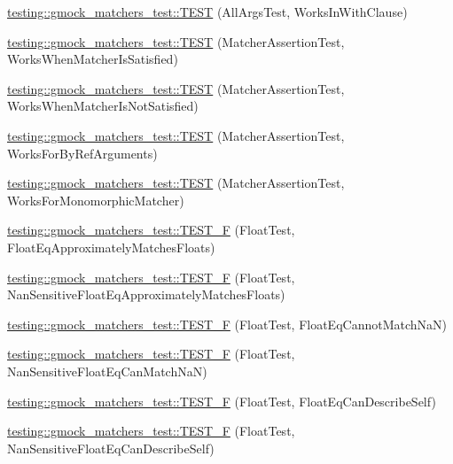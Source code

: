 \begin{DoxyCompactItemize}
\item 
\hyperlink{namespacetesting_1_1gmock__matchers__test_ad62534535946b2ef45457fb653f73a98}{testing\+::gmock\+\_\+matchers\+\_\+test\+::\+T\+E\+ST} (All\+Args\+Test, Works\+In\+With\+Clause)
\item 
\hyperlink{namespacetesting_1_1gmock__matchers__test_ad37559f9112c04334a62ce9617cf1349}{testing\+::gmock\+\_\+matchers\+\_\+test\+::\+T\+E\+ST} (Matcher\+Assertion\+Test, Works\+When\+Matcher\+Is\+Satisfied)
\item 
\hyperlink{namespacetesting_1_1gmock__matchers__test_a2f3755be7052d6e7769e3323053399d0}{testing\+::gmock\+\_\+matchers\+\_\+test\+::\+T\+E\+ST} (Matcher\+Assertion\+Test, Works\+When\+Matcher\+Is\+Not\+Satisfied)
\item 
\hyperlink{namespacetesting_1_1gmock__matchers__test_afcf1287c7fd759157367026613ddd727}{testing\+::gmock\+\_\+matchers\+\_\+test\+::\+T\+E\+ST} (Matcher\+Assertion\+Test, Works\+For\+By\+Ref\+Arguments)
\item 
\hyperlink{namespacetesting_1_1gmock__matchers__test_a0fe4bde05f667c4877e3b4a4a7bde002}{testing\+::gmock\+\_\+matchers\+\_\+test\+::\+T\+E\+ST} (Matcher\+Assertion\+Test, Works\+For\+Monomorphic\+Matcher)
\item 
\hyperlink{namespacetesting_1_1gmock__matchers__test_a69257e935b4334c835b3ad26acea9104}{testing\+::gmock\+\_\+matchers\+\_\+test\+::\+T\+E\+S\+T\+\_\+F} (Float\+Test, Float\+Eq\+Approximately\+Matches\+Floats)
\item 
\hyperlink{namespacetesting_1_1gmock__matchers__test_abb691880cd22f6f444c978547b13f792}{testing\+::gmock\+\_\+matchers\+\_\+test\+::\+T\+E\+S\+T\+\_\+F} (Float\+Test, Nan\+Sensitive\+Float\+Eq\+Approximately\+Matches\+Floats)
\item 
\hyperlink{namespacetesting_1_1gmock__matchers__test_a111f0c8a5ec17b47e8eb6226e1c2cb58}{testing\+::gmock\+\_\+matchers\+\_\+test\+::\+T\+E\+S\+T\+\_\+F} (Float\+Test, Float\+Eq\+Cannot\+Match\+NaN)
\item 
\hyperlink{namespacetesting_1_1gmock__matchers__test_a4e9d89902e088a10915b4f9463ac0f09}{testing\+::gmock\+\_\+matchers\+\_\+test\+::\+T\+E\+S\+T\+\_\+F} (Float\+Test, Nan\+Sensitive\+Float\+Eq\+Can\+Match\+NaN)
\item 
\hyperlink{namespacetesting_1_1gmock__matchers__test_a264de01a5019e5c358116845bf5edd14}{testing\+::gmock\+\_\+matchers\+\_\+test\+::\+T\+E\+S\+T\+\_\+F} (Float\+Test, Float\+Eq\+Can\+Describe\+Self)
\item 
\hyperlink{namespacetesting_1_1gmock__matchers__test_a95a2bbc273ff70fc364c5c9c4697834c}{testing\+::gmock\+\_\+matchers\+\_\+test\+::\+T\+E\+S\+T\+\_\+F} (Float\+Test, Nan\+Sensitive\+Float\+Eq\+Can\+Describe\+Self)

\end{DoxyCompactItemize}
